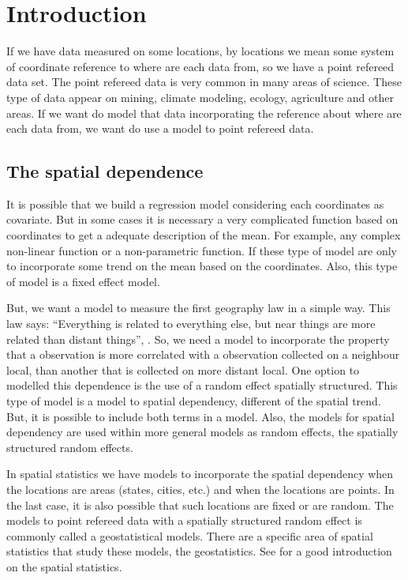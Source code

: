 
\section{Introduction} 

If we have data measured on some locations, 
by locations we mean some system of coordinate 
reference to where are each data from, so we 
have a point refereed data set. 
The point refereed data is very common in many 
areas of science. These type of data appear on 
mining, climate modeling, ecology, agriculture 
and other areas. 
If we want do model that data incorporating 
the reference about where are each data from, 
we want do use a model to point refereed data. 

\subsection{The spatial dependence}

It is possible that we build a regression model 
considering each coordinates as covariate. 
But in some cases it is necessary a very 
complicated function based on coordinates to 
get a adequate description of the mean. 
For example, any complex non-linear function or 
a non-parametric function. 
If these type of model are only to incorporate 
some trend on the mean based on the coordinates. 
Also, this type of model is a fixed effect model. 

But, we want a model to measure the first geography 
law in a simple way. 
This law says: ``Everything is related to everything else, 
but near things are more related than distant things'', 
\cite{tobler:1970}. 
So, we need a model to incorporate the property that a 
observation is more correlated with a observation 
collected on a neighbour local, than another that 
is collected on more distant local. 
One option to modelled this dependence is the use 
of a random effect spatially structured. 
This type of model is a model to spatial dependency, 
different of the spatial trend. 
But, it is possible to include both terms in a model. 
Also, the models for spatial dependency are used 
within more general models as random effects, 
the spatially structured random effects. 

In spatial statistics we have models to incorporate the 
spatial dependency when the locations are areas 
(states, cities, etc.) and when the locations are points. 
In the last case, it is also possible that such 
locations are fixed or are random. 
The models to point refereed data with a spatially 
structured random effect is commonly called a 
geostatistical models. 
There are a specific area of spatial statistics 
that study these models, the geostatistics. 
See \cite{cressie:1993} for a good introduction on 
the spatial statistics. 

